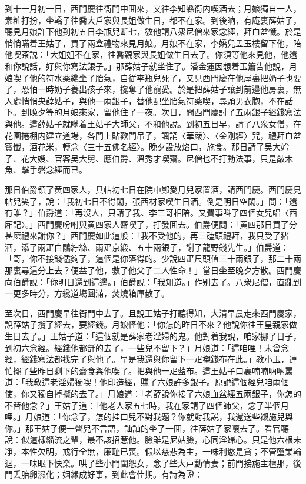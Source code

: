 到十一月初一日，西門慶往衙門中囬來，又往李知縣衙内喫酒去；月娘獨自一人，素粧打扮，坐轎子往喬大戶家與長姐做生日，都不在家。到後晌，有庵裏薛姑子，聽見月娘許下他到初五日李瓶兒断七，敎他請八衆尼僧來家念經，拜血盆懺。於是悄悄瞞着王姑子，買了兩盒禮物來見月娘。月娘不在家，李嬌兒孟玉樓留下他，陪他喫茶説：「大姐姐不在家，往喬親家與長姐做生日去了。你須等他來見他，他還和你說話，好與你寫法銀子。」那薛姑子就坐住了。潘金蓮因想着玉簫告他說，月娘喫了他的符水薬纔坐了胎氣，自従李瓶兒死了，又見西門慶在他屋裏把奶子也要了，恐怕一時奶子養出孩子來，攙奪了他寵愛。於是把薛姑子讓到前邊他房裏，無人處悄悄央薛姑子，與他一兩銀子，替他配坐胎氣符薬喫，尋頭男衣胞，不在話下。到晚夕等的月娘來家，留他住了一夜。次日，問西門慶討了五兩銀子經錢寫法與他。這薛姑子就瞞着王姑子大師父，不和他說。到初五日早，請了八衆女僧，在花園捲棚内建立道場，各門上貼歡門吊子，諷誦〈華嚴〉、〈金剛經〉咒，禮拜血盆寳懺，酒花米，轉念〈三十五佛名經〉。晚夕設放焰口，施食。那日請了吴大妗子、花大嫂、官客吴大舅、應伯爵、溫秀才喫齋。尼僧也不打動法事，只是敲木魚、擊手磐念經而已。

那日伯爵領了黄四家人，具帖初七日在院中鄭愛月兒家置酒，請西門慶。西門慶見帖兒笑了，說：「我初七日不得閑，張西材家喫生日酒。倒是明日空閑。」問：「還有誰？」伯爵道：「再沒人，只請了我、李三哥相陪。又費事呌了四個女兒唱〈西廂記〉。」西門慶吩咐與黄四家人齋喫了，打發囬去。伯爵便問：「黄四那日買了分甚麽禮來謝你？」西門慶如此這般：「我不受他的，再三磕頭禮拜，我只受了猪酒，添了兩疋白鷴紵絲、兩疋京緞、五十兩銀子，謝了龍野錢先生。」伯爵道：「哥，你不接錢儘夠了，這個是你落得的。少說四疋尺頭值三十兩銀子，那二十兩那裏尋這分上去？便益了他，救了他父子二人性命！」當日坐至晚夕方散。西門慶向伯爵說：「你明日還到這邊。」伯爵說：「我知道。」作别去了。八衆尼僧，直亂到一更多時分，方纔道塲圓滿，焚燒箱庫散了。

至次日，西門慶早往衙門中去了。且說王姑子打聽得知，大清早晨走來西門慶家，說薛姑子攬了經去，要經錢。月娘怪他：「你怎的昨日不來？他說你往王皇親家做生日去了。」王姑子道：「這個就是薛家老淫婦的鬼。他對着我說，咱家挪了日子，到初六念經。經錢他都㧱的去了，一些兒不留下？」月娘道：「這咱哩！未曾念經，經錢寫法都找完了與他了。早是我還與你留下一疋襯錢布在此。」教小玉，連忙擺了些昨日剩下的齋食與他喫了。把與他一疋藍布。這王姑子口裏喃喃呐呐罵道：「我敎這老淫婦獨喫！他印造經，賺了六娘許多銀子。原說這個經兒咱兩個使，你又獨自掉攬的去了。」月娘道：「老薛說你接了六娘血盆經五兩銀子，你怎的不替他念？」王姑子道：「他老人家五七時，我在家請了四個師父，念了半個月哩。」月娘道：「你念了，怎的挂口兒不對我題？你就對我説，我還送些襯施兒與你。」那王姑子便一聲兒不言語，訕訕的坐了一囬，往薛姑子家嚷去了。看官聽說：似這樣緇流之輩，最不該招惹他。臉雖是尼姑臉，心同淫婦心。只是他六根未凈，本性欠明，戒行全無，廉耻已喪。假以慈悲為主，一味利慾是貪；不管墮業輪迴，一味眼下快楽。哄了些小門閨怨女，念了些大戸動情妻；前門接施主檀那，後門丢胎卵濕化；姻緣成好事，到此會佳期。有詩為證：

